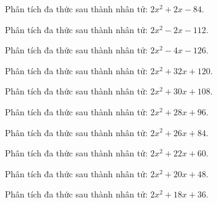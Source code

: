 \begin{bt}
	Phân tích đa thức sau thành nhân tử: $2 x^2 + 2 x - 84$.
\end{bt}
\begin{bt}
	Phân tích đa thức sau thành nhân tử: $2 x^2 - 2 x - 112$.
\end{bt}
\begin{bt}
	Phân tích đa thức sau thành nhân tử: $2 x^2 - 4 x - 126$.
\end{bt}
\begin{bt}
	Phân tích đa thức sau thành nhân tử: $2 x^2 + 32 x + 120$.
\end{bt}
\begin{bt}
	Phân tích đa thức sau thành nhân tử: $2 x^2 + 30 x + 108$.
\end{bt}
\begin{bt}
	Phân tích đa thức sau thành nhân tử: $2 x^2 + 28 x + 96$.
\end{bt}
\begin{bt}
	Phân tích đa thức sau thành nhân tử: $2 x^2 + 26 x + 84$.
\end{bt}
\begin{bt}
	Phân tích đa thức sau thành nhân tử: $2 x^2 + 22 x + 60$.
\end{bt}
\begin{bt}
	Phân tích đa thức sau thành nhân tử: $2 x^2 + 20 x + 48$.
\end{bt}
\begin{bt}
	Phân tích đa thức sau thành nhân tử: $2 x^2 + 18 x + 36$.
\end{bt}
